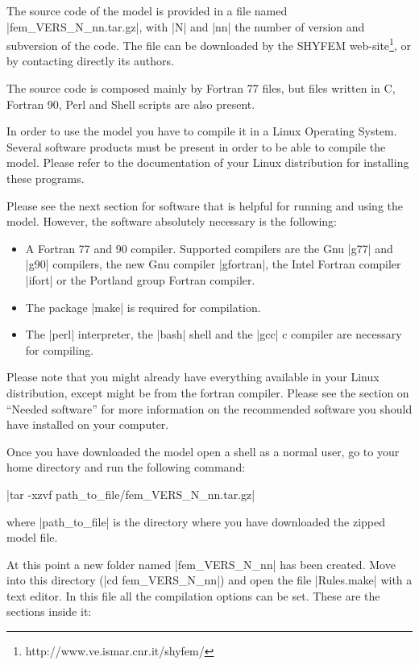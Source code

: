 
The source code of the model is provided in a file named 
|fem_VERS_N_nn.tar.gz|, with |N| and |nn| the
number of version and subversion of the code.
The file can be downloaded by the SHYFEM 
web-site\footnote{http://www.ve.ismar.cnr.it/shyfem/}, or
by contacting directly its authors.

The source code is composed mainly by Fortran 77 files, but
files written in C, Fortran 90, Perl and Shell scripts
are also present.

In order to use the model you have to compile it in a
Linux Operating System. Several software products must be present
in order to be able to compile the model. Please refer to
the documentation of your Linux distribution for installing these programs.

Please see the next section for software that is
helpful for running and using the model.
However, the software absolutely necessary is the following:

\begin{itemize}
\item A Fortran 77 and 90 compiler. Supported compilers are
the Gnu |g77| and |g90| compilers, the new Gnu compiler |gfortran|,
the Intel Fortran compiler |ifort| or the Portland group Fortran compiler.
\item The package |make| is required for compilation.
\item The |perl| interpreter, the |bash| shell and the |gcc| c compiler
are necessary for compiling.
\end{itemize}
Please note that you might already have everything available in your
Linux distribution, except might be from the fortran compiler.
Please see the section on ``Needed software'' for more information
on the recommended software you should have installed on your computer.

Once you have downloaded the model open a shell as 
a normal user, go to your home directory and run the
following command:

\begin{citation}
\item |tar -xzvf path_to_file/fem_VERS_N_nn.tar.gz|
\end{citation}

where |path_to_file| is the directory where you have downloaded the
zipped model file.

At this point a new folder named |fem_VERS_N_nn|
has been created. Move into this directory (|cd fem_VERS_N_nn|) 
and open the file
|Rules.make| with a text editor.
In this file all the compilation options can be set.
These are the sections inside it:

